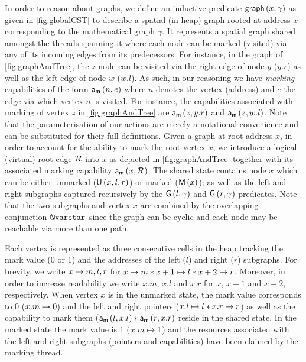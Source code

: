 In order to reason about graphs, we define an inductive predicate $\textsf{graph}\left(x, \gamma\right)$ as given in \fig\ref{fig:globalCST} to describe a spatial (in heap) graph rooted at address $x$ corresponding to the mathematical graph $\gamma$. It represents a spatial graph shared amongst the threads spanning it where each node can be marked (visited) via any of its incoming edges from its predecessors. For instance, in the graph of \fig\ref{fig:graphAndTree}, the $z$ node can be visited via the right edge of node $y$ ($y.r$) as well as the left edge of node $w$ ($w.l$). As such, in our reasoning we have \emph{marking} capabilities of the form $\mathsf{a}_{\textsf{m}}\left(n, e\right)$ where $n$ denotes the vertex (address) and $e$ the edge via which vertex $n$ is visited. For instance, the capabilities associated with marking of vertex $z$ in \fig\ref{fig:graphAndTree} are $\mathsf{a}_{\textsf{m}}\left(z, y.r\right)$ and $\mathsf{a}_{\textsf{m}}\left(z, w.l\right)$. Note that the parameterisation of our actions are merely a notational convenience and can be substituted for their full definitions. Given a graph  at root address $x$, in order to account for the ability to mark the root vertex $x$, we introduce a logical (virtual) root edge $\mathcal{R}$ into $x$ as depicted in \fig\ref{fig:graphAndTree} together with its associated marking capability $\mathsf{a}_{\textsf{m}}\left(x, \mathcal{R}\right)$. The shared state contains node $x$ which can be either unmarked ($\textsf{U}\left(x, l, r\right)$) or marked ($\textsf{M}\left(x\right)$); as well as the left and right subgraphs captured recursively by the $\textsf{G}\left(l, \gamma\right)$ and $\textsf{G}\left(r, \gamma\right)$ predicates. Note that the two subgraphs and vertex $x$ are combined by the overlapping conjunction $\sepish$ since the graph can be cyclic and each node may be reachable via more than one path. 

Each vertex is represented as three consecutive cells in the heap tracking the mark value ($0$ or $1$) and the addresses of the left ($l$) and right ($r$) subgraphs. For brevity, we write $x \mapsto m, l, r$ for $x \mapsto m * x+1 \mapsto l * x+2 \mapsto r$. Moreover, in order to increase readability we write $x.m$, $x.l$ and $x.r$ for $x$, $x+1$ and $x+2$, respectively. When vertex $x$ is in the unmarked state, the mark value corresponds to $0$ ($x.m \mapsto 0$) and the left and right pointers ($x.l \mapsto l * x.r \mapsto r$) as well as the capability to mark them ($\mathsf{a}_{\textsf{m}}\left(l, x.l\right) * \mathsf{a}_{\textsf{m}}\left(r, x.r\right)$ reside in the shared state. In the marked state the mark value is $1$ ($x.m \mapsto 1$) and the resources associated with the left and right subgraphs (pointers and capabilities) have been claimed by the marking thread. 

